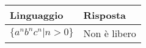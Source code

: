 \documentclass{standalone}
\begin{document}
\begin{tabularx}{\textwidth}{|X |X |}
	\toprule
		Linguaggio & Risposta \\
    \hline
        $\{ a^n b^n c^n | n > 0 \}$
        &
				Non è libero
        \\
    \bottomrule
\end{tabularx}
\end{document}
